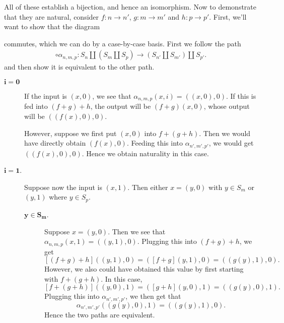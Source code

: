 \begin{example}
    All of these establish a bijection, and hence an isomorphism. 
    Now to demonstrate that they are natural, consider $f: n \to n'$, 
    $g: m \to m'$ and $h: p \to p'$.
    First, we'll want to show that the diagram 
    \begin{center}
    \end{center}
    commutes, which we can do by a case-by-case basis.
    First we follow the path
    \begin{align*}
        [(f + g) + h] \circ \alpha_{n, m, p}: 
        S_n\amalg(S_m \amalg S_p) \to (S_{n'}\amalg S_{m'})\amalg S_{p'}.
    \end{align*}
    and then show it is equivalent to the other path.
    \begin{description}
        \item[$\bm{i = 0}$]
        If the input is $(x, 0)$, we see that $\alpha_{n,m,p}(x, i) = ((x,0),0)$.
        If this is fed into $(f + g) + h$, the output will be $(f + g)(x, 0)$, whose output 
        will be $((f(x), 0), 0)$. 

        However, suppose we first put $(x, 0)$ into $f+ (g + h)$. Then 
        we would have directly obtain $(f(x), 0)$. Feeding this into $\alpha_{n', m', p'}$, we would 
        get $((f(x), 0), 0)$. Hence we obtain naturality in this case. 

        \item[$\bm{i = 1}$.]
        Suppose now the input is $(x, 1)$. Then either $x = (y, 0)$ with $y \in S_m$ 
        or $(y, 1)$ where $y \in S_p$. 

        \begin{description}
            \item[$\bm{y \in S_m}$.] Suppose $x = (y, 0)$. Then we see that 
            $\alpha_{n,m,p}(x, 1) = ((y, 1), 0)$. Plugging this into $( f+ g) + h$, we 
            get 
            \[
                [ ( f+ g) + h]((y, 1), 0) = ([f + g](y, 1), 0) = ((g(y), 1), 0).
            \]
            However, we also could have obtained this value by first starting with  
            $f + (g + h)$. In this case, 
            \[
                [f + (g + h)]((y, 0), 1) = ([g + h](y, 0), 1) = ((g(y), 0), 1). 
            \]
            Plugging this into $\alpha_{n',m',p'}$, we then get that 
            \[
                \alpha_{n',m',p'}((g(y), 0), 1) = ((g(y), 1), 0).
            \]
            Hence the two paths are equivalent. 


\end{description}
\end{description}
\end{example}
